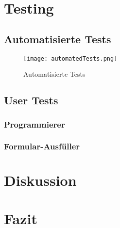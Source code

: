 \section{Testing}
\label{sec:testing}

\subsection{Automatisierte Tests}
\label{sec:automatedTests}

\begin{figure}[!htb]
    \centering
    \texttt{[image: automatedTests.png]}
    \caption{Automatisierte Tests}
    \label{img:automatedTests}
\end{figure}

\subsection{User Tests} %
\label{sec:userTests}


\subsubsection{Programmierer}
\label{sec:userTestsProgrammer}


\subsubsection{Formular-Ausfüller}
\label{sec:userTestsEnduser}



\section{Diskussion}
\label{sec:discusion}


\section{Fazit}
\label{sec:summeryNew}

